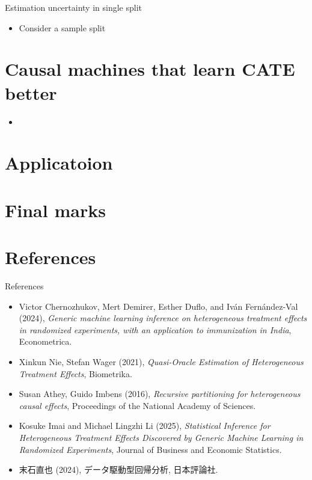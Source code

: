 \documentclass[xcolor=svgnames,aspectratio=169]{beamer}
\begin{document}
\begin{frame}{Estimation uncertainty in single split}
    \begin{itemize}
        \item Consider a sample split 
    \end{itemize}
\end{frame}

\section{Causal machines that learn CATE better}

\begin{frame}
    \begin{itemize}
        \item 
    \end{itemize}
\end{frame}

\section{Applicatoion}

\section{Final marks}

\section{References}

\begin{frame}{References}
    \begin{itemize}
        \item Victor Chernozhukov, Mert Demirer, Esther Duflo, and Iván Fernández-Val (2024), \textit{Generic machine learning inference on heterogeneous treatment effects in randomized experiments, with an application to immunization in India}, Econometrica.
        \item Xinkun Nie, Stefan Wager (2021), \textit{Quasi-Oracle Estimation of Heterogeneous Treatment Effects}, Biometrika.
        \item Susan Athey, Guido Imbens (2016), \textit{Recursive partitioning for heterogeneous causal effects}, Proceedings of the National Academy of Sciences. 
        \item Kosuke Imai and Michael Lingzhi Li (2025), \textit{Statistical Inference for Heterogeneous Treatment Effects Discovered by Generic Machine Learning in Randomized Experiments}, Journal of Business and Economic Statistics.
        \item 末石直也 (2024), データ駆動型回帰分析, 日本評論社.
    \end{itemize}
\end{frame}
\end{document}
